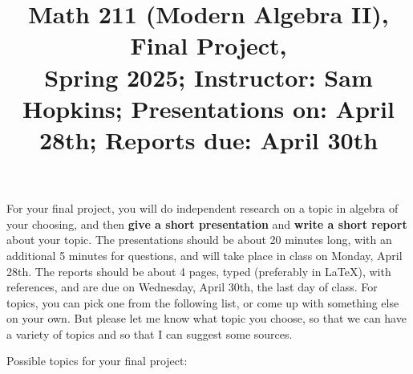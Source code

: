 \documentclass[11pt]{article}
\title{Math 211 (Modern Algebra II), Final Project, \\ {\normalsize Spring 2025; Instructor: Sam Hopkins; Presentations on: April 28th; Reports due: April 30th}}
\date{}
\begin{document}
\maketitle

\thispagestyle{empty}

\vspace{-1.5cm}

For your final project, you will do independent research on a topic in algebra of your choosing, and then {\bf give a short presentation} and {\bf write a short report} about your topic. The presentations should be about 20 minutes long, with an additional 5 minutes for questions, and will take place in class on Monday, April 28th. The reports should be about 4 pages, typed (preferably in LaTeX), with references, and are due on Wednesday, April 30th, the last day of class. For topics, you can pick one from the following list, or come up with something else on your own. But please let me know what topic you choose, so that we can have a variety of topics and so that I can suggest some sources.

Possible topics for your final project:

\vspace{-0.2cm}
\end{document}
